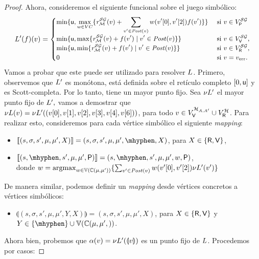 \begin{proof}
    Ahora, consideremos el siguiente funcional sobre el juego simbólico:
\[\small
\Bellman'(f)(v) =
    \begin{cases}
           \displaystyle \min \{ \upperbound, \max_{w \in VC} \{\mreward^\SymbG(v)  + \sum_{v' \in \post(v)} w(\pr{0}{v'},\pr{2}{v'})  f(v') \} \}& \text{ si }v \in V^{\SymbG}_\Probabilistic  \\
           \displaystyle \min \{ \upperbound, \max \{\mreward^\SymbG(v)  +f(v') \mid v' \in \post(v) \} \} & \text{ si } v \in  V^{\SymbG}_\Verifier, \\
           \displaystyle \min \{ \upperbound, \min \{\mreward^\SymbG(v) + f(v') \mid v' \in \post(v) \} \} & \text{ si } v \in  V^{\SymbG}_\Refuter, \\
           \displaystyle 0 & \text{ si } v=\ErrorSt.
           \displaystyle 
    \end{cases}
\]
Vamos a probar que este puede ser utilizado para resolver $\Bellman$. Primero, observemos que $\Bellman'$ es monótona,  está definida sobre el retículo completo $[0,\upperbound]$ y es Scott-completa. Por lo tanto, tiene un mayor punto fijo.  Sea $\nu \Bellman'$ el mayor punto fijo de $\Bellman',$  vamos a demostrar que
$\nu \Bellman(v) = \nu \Bellman'((v[0],v[1],v[2],v[3],v[4], v[6]))$, para todo $v \in V^{\mathcal{H}_{A,A'}}_\Verifier \cup V^{\mathcal{H}}_\Refuter$.
Para realizar esto, consideremos para cada vértice simbólico el siguiente \emph{mapping}:
\begin{itemize}
    \item $\llbracket (s,\sigma,s',\mu,\mu',X) \rrbracket = (s,\sigma,s',\mu,\mu',\mhyphen,X)$, para $X \in \{\Refuter, \Verifier\}$,
    \item $\llbracket (s,\mhyphen, s',\mu,\mu',\Probabilistic) \rrbracket =(s, \mhyphen,s', \mu,\mu', w,\Probabilistic)$,  \\ donde
              $w = \argmax_{w \in \vertices{\couplings{\mu}{\mu'}}} \{\sum_{v' \in \post(v)} w(\pr{0}{v'},\pr{2}{v'})  \nu \Bellman'(v') \}$
\end{itemize}
    De manera similar, podemos definir un \emph{mapping} desde vértices concretos a vértices simbólicos:
\begin{itemize}
    \item $\llparenthesis (s,\sigma,s',\mu,\mu',Y ,X) \rrparenthesis = (s,\sigma,s',\mu,\mu',X)$, para $X \in \{\Refuter, \Verifier \}$ y $Y \in \{\mhyphen \} \cup \vertices{\couplings{\mu,\mu'}}$.
\end{itemize}
    Ahora bien, probemos que $\alpha(v) = \nu \Bellman'(\llparenthesis v \rrparenthesis)$ es un punto fijo de $\Bellman$. Procedemos por casos:
   

\end{proof}
